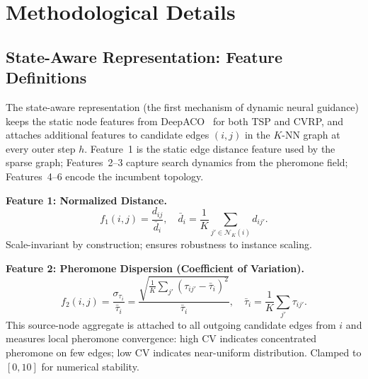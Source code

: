 \documentclass[sigconf]{acmart}
\begin{document}
\newpage



\newpage
\appendix

\setcounter{table}{0}
\renewcommand{\thetable}{A\arabic{table}}
\setcounter{figure}{0}
\renewcommand{\thefigure}{A\arabic{figure}}
\setcounter{algorithm}{0}
\renewcommand{\thealgorithm}{A\arabic{algorithm}}

\section{Methodological Details}
\label{app:method}

\subsection{State-Aware Representation: Feature Definitions}
\label{app:state-features}

The state-aware representation (the first mechanism of dynamic neural guidance) keeps the static node features from DeepACO~\cite{deepaco} for both TSP and CVRP, and attaches additional features to candidate edges $(i,j)$ in the $K$-NN graph at every outer step $h$.
Feature~1 is the static edge distance feature used by the sparse graph; Features~2--3 capture search dynamics from the pheromone field; Features~4--6 encode the incumbent topology.

\textbf{Feature 1: Normalized Distance.}
\begin{equation}
f_1(i,j) = \frac{d_{ij}}{\bar{d}_i}, \quad \bar{d}_i = \frac{1}{K} \sum_{j' \in \mathcal{N}_K(i)} d_{ij'}.
\end{equation}
Scale-invariant by construction; ensures robustness to instance scaling.

\textbf{Feature 2: Pheromone Dispersion (Coefficient of Variation).}
\begin{equation}
f_2(i,j) = \frac{\sigma_{\tau_i}}{\bar{\tau}_i} = \frac{\sqrt{\frac{1}{K}\sum_{j'} (\tau_{ij'} - \bar{\tau}_i)^2}}{\bar{\tau}_i}, \quad \bar{\tau}_i = \frac{1}{K}\sum_{j'} \tau_{ij'}.
\end{equation}
This source-node aggregate is attached to all outgoing candidate edges from $i$ and measures local pheromone convergence: high CV indicates concentrated pheromone on few edges; low CV indicates near-uniform distribution.
Clamped to $[0, 10]$ for numerical stability.
\end{document}
